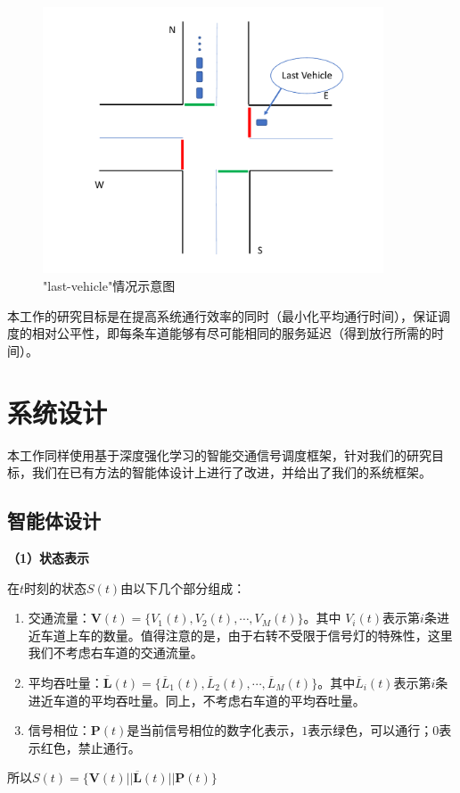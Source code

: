 \begin{figure}[t]
  \includegraphics[width=0.9\textwidth]{fig/lastvehicle.pdf}
  \caption{"last-vehicle"情况示意图}
  \label{fig:last-vehicle}
\end{figure}
本工作的研究目标是在提高系统通行效率的同时（最小化平均通行时间），保证调度的相对公平性，即每条车道能够有尽可能相同的服务延迟（得到放行所需的时间）。

\section{系统设计}
本工作同样使用基于深度强化学习的智能交通信号调度框架，针对我们的研究目标，我们在已有方法的智能体设计上进行了改进，并给出了我们的系统框架。
\subsection{智能体设计}
\textbf{（1）状态表示}

在$t$时刻的状态$S(t)$由以下几个部分组成：
\begin{enumerate}
\item 交通流量：$\boldsymbol{V}(t)=\{V_1(t),V_2(t),\cdots,V_M(t)\}$。其中 $V_i(t)$表示第$i$条进近车道上车的数量。值得注意的是，由于右转不受限于信号灯的特殊性，这里我们不考虑右车道的交通流量。
\item 平均吞吐量：$\boldsymbol{\overline{L}}(t)=\{\overline{L}_1(t),\overline{L}_2(t),\cdots,\overline{L}_M(t)\}$。其中$\overline{L}_i(t)$表示第$i$条进近车道的平均吞吐量。同上，不考虑右车道的平均吞吐量。
\item 信号相位：$\boldsymbol{P}(t)$是当前信号相位的数字化表示，$1$表示绿色，可以通行；$0$表示红色，禁止通行。
\end{enumerate}
所以$S(t)=\{\boldsymbol{V}(t) || \boldsymbol{\overline{L}}(t) || \boldsymbol{P}(t) \}$

